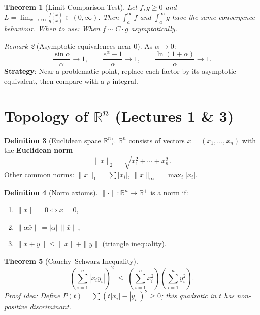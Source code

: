 \documentclass[12pt,a4paper]{article}
\newtheorem{theorem}{Theorem}[section]
\theoremstyle{definition}
\newtheorem{definition}[theorem]{Definition}
\theoremstyle{remark}
\newtheorem{remark}[theorem]{Remark}
\newcommand{\R}{\mathbb{R}}
\newcommand{\xbar}{\bar{x}}
\begin{document}
\begin{theorem}[Limit Comparison Test]
Let $f,g\ge 0$ and $\displaystyle L = \lim_{x\to\infty}\frac{f(x)}{g(x)}\in(0,\infty)$.
Then $\int_a^{\infty}f$ and $\int_a^{\infty}g$ have the same convergence behaviour.
\textit{When to use:} When $f\sim C\cdot g$ asymptotically.
\end{theorem}

\begin{remark}[Asymptotic equivalences near $0$]
As $\alpha\to 0$:
\[
  \frac{\sin\alpha}{\alpha}\to 1,\qquad
  \frac{e^{\alpha}-1}{\alpha}\to 1,\qquad
  \frac{\ln(1+\alpha)}{\alpha}\to 1.
\]
\textbf{Strategy}: Near a problematic point, replace each factor by its asymptotic equivalent, then compare with a $p$-integral.
\end{remark}

\section{Topology of $\R^n$ (Lectures 1 \& 3)}

\begin{definition}[Euclidean space $\R^n$]
$\R^n$ consists of vectors $\xbar=(x_1,\dots,x_n)$ with the \textbf{Euclidean norm}
\[
  \|\xbar\|_2 = \sqrt{x_1^2+\cdots+x_n^2}.
\]
Other common norms: $\|\xbar\|_1=\sum|x_i|$, $\|\xbar\|_\infty=\max_i|x_i|$.
\end{definition}

\begin{definition}[Norm axioms]
$\|\cdot\|:\R^n\to\R^+$ is a norm if:
\begin{enumerate}
  \item $\|\xbar\|=0 \iff \xbar=0$,
  \item $\|\alpha\xbar\|=|\alpha|\,\|\xbar\|$,
  \item $\|\xbar+\bar{y}\|\le\|\xbar\|+\|\bar{y}\|$ \quad (triangle inequality).
\end{enumerate}
\end{definition}

\begin{theorem}[Cauchy--Schwarz Inequality]
\[
  \left(\sum_{i=1}^n |x_i y_i|\right)^2 \;\le\; \left(\sum_{i=1}^n x_i^2\right)\left(\sum_{i=1}^n y_i^2\right).
\]
\textit{Proof idea}: Define $P(t)=\sum(t|x_i|-|y_i|)^2\ge 0$; this quadratic in $t$ has non-positive discriminant.
\end{theorem}
\end{document}
